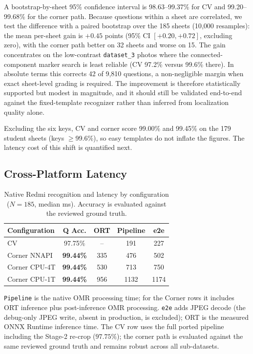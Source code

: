 \documentclass[conference]{IEEEtran}
\begin{document}
A bootstrap-by-sheet 95\% confidence interval is 98.63--99.37\% for CV and
99.20--99.68\% for the corner path. Because questions within a sheet are
correlated, we test the difference with a paired bootstrap over the 185
sheets (10{,}000 resamples): the mean per-sheet gain is $+0.45$ points (95\% CI $[+0.20,+0.72]$,
excluding zero), with the corner path better on 32 sheets and worse on 15.
The gain concentrates on the low-contrast \texttt{dataset\_3} photos where
the connected-component marker search is least reliable (CV 97.2\% versus
99.6\% there). In absolute terms this corrects 42 of 9{,}810 questions, a non-negligible
margin when exact sheet-level grading is required. The improvement is therefore
statistically supported but modest in magnitude, and it should still be validated
end-to-end against the fixed-template recognizer rather than inferred from
localization quality alone.

Excluding the six keys, CV and corner score 99.00\% and 99.45\% on the 179
student sheets (keys $\geq$99.6\%), so easy templates do not inflate the figures.
The latency cost of this shift is quantified next. 

\subsection{Cross-Platform Latency}

\begin{table}[!htb]
\caption{Native Redmi recognition and latency by configuration ($N{=}185$,
median ms). Accuracy is evaluated against the reviewed ground truth.}
\label{tab:stage-mini}
\centering
\setlength{\tabcolsep}{6pt}
\footnotesize
\begin{tabular}{lcccc}
\toprule
\textbf{Configuration} & \textbf{Q Acc.} & \textbf{ORT} & \textbf{Pipeline} & \textbf{e2e} \\
\midrule
CV              & 97.75\%         & --  & 191  & 227  \\
Corner NNAPI    & \textbf{99.44\%} & 335 & 476  & 502  \\
Corner CPU-4T   & \textbf{99.44\%} & 530 & 713  & 750  \\
Corner CPU-1T   & \textbf{99.44\%} & 956 & 1132 & 1174 \\
\bottomrule
\end{tabular}

\vspace{2pt}
\parbox{\columnwidth}{\footnotesize
\texttt{Pipeline} is the native OMR processing time; for the Corner rows it
includes ORT inference plus post-inference OMR processing. \texttt{e2e} adds
JPEG decode (the
debug-only JPEG write, absent in production, is excluded); ORT is the
measured ONNX Runtime inference time. The CV row uses the full ported
pipeline including the Stage-2 re-crop ($97.75\%$); the corner path is
evaluated against the same reviewed ground truth and remains robust across all sub-datasets.}
\end{table}
\end{document}
